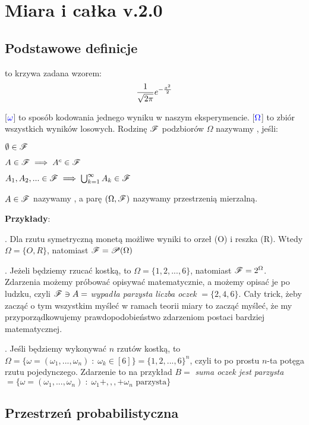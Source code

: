 \section{Miara i całka v.2.0}

\subsection{Podstawowe definicje}

 to krzywa zadana wzorem:
$${1\over\sqrt{2\pi}}e^{-{x^2\over2}}$$

 [$\color{blue}\omega$] to sposób kodowania jednego wyniku w naszym eksperymencie.  [$\color{blue}\Omega$] to zbiór wszystkich wyników losowych. Rodzinę $\mathcal{F}$ podzbiorów $\Omega$ nazywamy , jeśli:

\indent \point $\emptyset\in\mathcal{F}$

\indent \point $A\in\mathcal{F}\implies A^c\in\mathcal{F}$

\indent \point $A_1, A_2,...\in \mathcal{F}\implies \bigcup_{k=1}^\infty A_k\in\mathcal{F}$
\smallskip

$A\in\mathcal{F}$ nazywamy , a parę $(\Omega,\mathcal{F})$ nazywamy przestrzenią mierzalną.
\medskip

\textbf{\large Przykłady}: 

. Dla rzutu symetryczną monetą możliwe wyniki to orzeł (O) i reszka (R). Wtedy $\Omega=\{O,R\}$, natomiast $\mathcal{F}=\mathcal{P}(\Omega)$

. Jeżeli będziemy rzucać kostką, to $\Omega=\{1,2,...,6\}$, natomiast $\mathcal{F}=2^{\Omega}$. Zdarzenia możemy próbować opisywać matematycznie, a możemy opisać je po ludzku, czyli $\mathcal{F}\ni A=$\emph{ wypadła parzysta liczba oczek} $=\{2,4,6\}$. Cały trick, żeby zacząć o tym wszystkim myśleć w ramach teorii miary to zacząć myśleć, że my przyporządkowujemy prawdopodobieństwo zdarzeniom postaci bardziej matematycznej.

. Jeśli będziemy wykonywać $n$ rzutów kostką, to $\Omega =\{\omega=(\omega_1,...,\omega_n)\;:\;\omega_k\in[6]\}=\{1,2,...,6\}^n$, czyli to po prostu $n$-ta potęga rzutu pojedynczego. Zdarzenie to na przykład $B=$\emph{ suma oczek jest parzysta }$=\{\omega=(\omega_1,...,\omega_n)\;:\;\omega_1+,,,+\omega_n\text{ parzysta}\}$

\subsection{Przestrzeń probabilistyczna}

